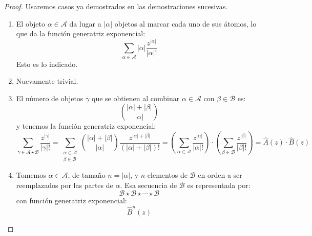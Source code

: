 \documentclass[english, spanish, fleqn, 10pt]{article}
\numberwithin{equation}{section}
\theoremstyle{definition}
\begin{document}
\begin{proof}
	Usaremos casos ya demostrados en las demostraciones sucesivas.
	\begin{enumerate}
		\item %
		El objeto \(\alpha \in \mathcal{A}\)
		da lugar a \(\lvert \alpha \rvert\) objetos
		al marcar cada uno de sus átomos,
		lo que da la función generatriz exponencial:
		\begin{equation*}
		\sum_{\alpha \in \mathcal{A}}
		\lvert \alpha \rvert
		\frac{z^{\lvert \alpha \rvert}}{\lvert \alpha \rvert !}
		\end{equation*}
		Esto es lo indicado.
		\item %
		Nuevamente trivial.
		\item %
		El número de objetos \(\gamma\) que se obtienen
		al combinar \(\alpha \in \mathcal{A}\)
		con \(\beta \in \mathcal{B}\) es:
		\begin{equation*}
		\binom{\lvert \alpha \rvert + \lvert \beta \rvert}
		{\lvert \alpha \rvert}
		\end{equation*}
		y tenemos la función generatriz exponencial:
		\begin{equation*}
		\sum_{\gamma \in \mathcal{A} \star \mathcal{B}}
		\frac{z^{\lvert \gamma \rvert}}{\lvert \gamma \rvert !}
		= \sum_{\substack{
				\alpha \in \mathcal{A} \\
				\beta \in \mathcal{B}
			}}
			\binom{\lvert \alpha \rvert + \lvert \beta \rvert}
			{\lvert \alpha \rvert}
			\frac{z^{\lvert \alpha \rvert
					+ \lvert \beta \rvert}}
			{(\lvert \alpha \rvert
				+ \lvert \beta \rvert)!}
			= \left(
			\sum_{\alpha \in \mathcal{A}}
			\frac{z^{\lvert \alpha \rvert}}
			{\lvert \alpha \rvert !}
			\right)
			\cdot \left(
			\sum_{\beta \in \mathcal{B}}
			\frac{z^{\lvert \beta \rvert}}
			{\lvert \beta \rvert !}
			\right)
			= \widehat{A}(z) \cdot \widehat{B}(z)
			\end{equation*}
			\item %
			Tomemos \(\alpha \in \mathcal{A}\),
			de tamaño \(n = \lvert \alpha \rvert\),
			y \(n\) elementos de \(\mathcal{B}\) en orden
			a ser reemplazados por las partes de \(\alpha\).
			Esa secuencia de \(\mathcal{B}\) es representada por:
			\begin{equation*}
			\mathcal{B}
			\star \mathcal{B}
			\star \dotsb
			\star \mathcal{B}
			\end{equation*}
			con función generatriz exponencial:
			\begin{equation*}
			\widehat{B}^n (z)

\end{equation*}
\end{enumerate}
\end{proof}
\end{document}
